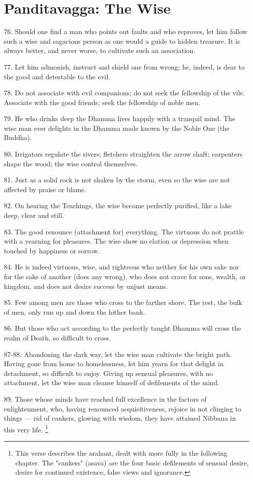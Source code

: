 \newpage
\chapter{Panditavagga: The Wise}

76. Should one find a man who points out faults and who reproves, let him follow such a wise and sagacious person as one would a guide to hidden treasure. It is always better, and never worse, to cultivate such an association.

77. Let him admonish, instruct and shield one from wrong; he, indeed, is dear to the good and detestable to the evil.

78. Do not associate with evil companions; do not seek the fellowship of the vile. Associate with the good friends; seek the fellowship of noble men.

79. He who drinks deep the Dhamma lives happily with a tranquil mind. The wise man ever delights in the Dhamma made known by the Noble One (the Buddha).

80. Irrigators regulate the rivers; fletchers straighten the arrow shaft; carpenters shape the wood; the wise control themselves.

81. Just as a solid rock is not shaken by the storm, even so the wise are not affected by praise or blame.

82. On hearing the Teachings, the wise become perfectly purified, like a lake deep, clear and still.

83. The good renounce (attachment for) everything. The virtuous do not prattle with a yearning for pleasures. The wise show no elation or depression when touched by happiness or sorrow.

84. He is indeed virtuous, wise, and righteous who neither for his own sake nor for the sake of another (does any wrong), who does not crave for sons, wealth, or kingdom, and does not desire success by unjust means.

85. Few among men are those who cross to the farther shore. The rest, the bulk of men, only run up and down the hither bank.

86. But those who act according to the perfectly taught Dhamma will cross the realm of Death, so difficult to cross.

87-88. Abandoning the dark way, let the wise man cultivate the bright path. Having gone from home to homelessness, let him yearn for that delight in detachment, so difficult to enjoy. Giving up sensual pleasures, with no attachment, let the wise man cleanse himself of defilements of the mind.

89. Those whose minds have reached full excellence in the factors of enlightenment, who, having renounced acquisitiveness, rejoice in not clinging to things — rid of cankers, glowing with wisdom, they have attained Nibbana in this very life. \footnote{This verse describes the arahant, dealt with more fully in the following chapter. The "cankers" (asava) are the four basic defilements of sensual desire, desire for continued existence, false views and ignorance.}
